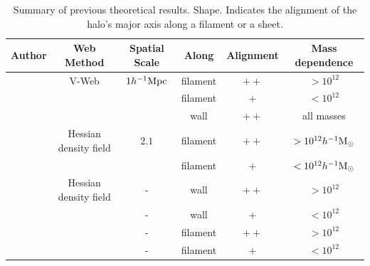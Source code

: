 \documentclass[usenatbib]{mn2e}
\newcommand{\hMpc}{{\ifmmode{h^{-1}{\rm Mpc}}\else{$h^{-1}$Mpc }\fi}}
\newcommand{\hMsun}{{\ifmmode{h^{-1}{\rm {M_{\odot}}}}\else{$h^{-1}{\rm{M_{\odot}}}$}\fi}}
\begin{document}
\begin{table}
\begin{tabular}{cccccc}\hline\hline
Author & Web Method & Spatial Scale & Along &
Alignment & Mass dependence\\\hline

\cite{Libeskind2013} & V-Web & $1 \hMpc$ & 
filament &$++$ & $>10^{12}$\hMsun\\

&   & & 
filament &$+$ & $<10^{12}$\hMsun\\

&   & & 
wall & $++$ & all masses\\

\cite{Zhang2009}  & Hessian density field &  $2.1$\hMpc & 
filament & $++$ & $>10^{12}\hMsun$\\

& &  & 
filament & $+$ & $<10^{12}\hMsun$\\

\cite{AragonCalvo2007} & Hessian density field & - &
wall & $++$ & $>10^{12}$\hMsun\\

& & - &
wall & $+$ & $<10^{12}$\hMsun\\

& & - &
filament& $++$ & $>10^{12}$\hMsun\\

& & - &
filament& $+$ & $<10^{12}$\hMsun\\\hline \hline

\end{tabular}\\
\caption{Summary of previous theoretical results.
Shape. Indicates the alignment of the halo's major axis along a
filament or a sheet.} 
\end{table}
\end{document}
